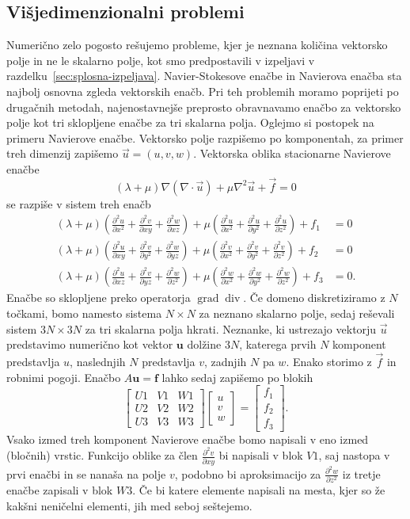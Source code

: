 \documentclass[12pt,a4paper,twoside]{article}
\theoremstyle{definition} %
\theoremstyle{plain} %
\numberwithin{equation}{section}
\renewcommand{\div}{\operatorname{div}}
\newcommand{\grad}{\operatorname{grad}}
\renewcommand{\b}{\boldsymbol}
\newcommand{\dpar}[2]{\ensuremath{\frac{\partial #1}{\partial #2}}}
\newcommand{\vu}{\vec{u}}
\newcommand{\vf}{\vec{f}}
\begin{document}
\subsection{Višjedimenzionalni problemi}
Numerično zelo pogosto rešujemo probleme, kjer je neznana količina vektorsko polje in
ne le skalarno polje, kot smo predpostavili v izpeljavi v
razdelku~\ref{sec:splosna-izpeljava}.  Navier-Stokesove enačbe in Navierova
enačba sta najbolj osnovna zgleda vektorskih enačb. Pri teh problemih moramo poprijeti
po drugačnih metodah, najenostavnejše preprosto obravnavamo enačbo za vektorsko polje
kot tri sklopljene enačbe za tri skalarna polja. Oglejmo si postopek na primeru Navierove
enačbe. Vektorsko polje razpišemo po komponentah, za primer treh dimenzij zapišemo
$\vu = (u, v, w)$. Vektorska oblika stacionarne Navierove enačbe
\[
  (\lambda+\mu)\nabla(\nabla\cdot \vu) + \mu\nabla^2 \vu + \vf = 0
\]
se razpiše v sistem treh enačb
\begin{align*}
(\lambda +\mu ) \left(\dpar{^2u}{x^2}+\dpar{^2v}{xy}+\dpar{^2w}{xz}\right)+\mu  \left(\dpar{^2u}{x^2}+\dpar{^2u}{y^2}+\dpar{^2u}{z^2}\right)+f_1&=0 \\
(\lambda +\mu ) \left(\dpar{^2u}{xy}+\dpar{^2v}{y^2}+\dpar{^2w}{yz}\right)+\mu  \left(\dpar{^2v}{x^2}+\dpar{^2v}{y^2}+\dpar{^2v}{z^2}\right)+f_2&=0 \\
(\lambda +\mu ) \left(\dpar{^2u}{xz}+\dpar{^2v}{yz}+\dpar{^2w}{z^2}\right)+\mu  \left(\dpar{^2w}{x^2}+\dpar{^2w}{y^2}+\dpar{^2w}{z^2}\right)+f_3&=0.
\end{align*}
Enačbe so sklopljene preko operatorja $\grad\div$. Če domeno diskretiziramo z $N$ točkami, bomo
namesto sistema $N\times N$ za neznano skalarno polje, sedaj reševali sistem $3N\times 3N$ za
tri skalarna polja hkrati. Neznanke, ki ustrezajo vektorju $\vu$ predstavimo numerično kot vektor
$\b{u}$ dolžine $3N$, katerega prvih $N$ komponent predstavlja $u$, naslednjih $N$ predstavlja $v$,
zadnjih $N$ pa $w$. Enako storimo z $\vf$ in robnimi pogoji. Enačbo $A\b u = \b f$ lahko sedaj
zapišemo po blokih
\[
  \begin{bmatrix}
    U1 & V1 & W1 \\
    U2 & V2 & W2 \\
    U3 & V3 & W3
  \end{bmatrix}
  \begin{bmatrix}
    u \\ v \\ w
  \end{bmatrix}
  =
  \begin{bmatrix}
    f_1 \\ f_2 \\ f_3
  \end{bmatrix}.
\]
Vsako izmed treh komponent Navierove enačbe bomo napisali v eno izmed (bločnih) vrstic. Funkcijo
oblike za člen $\dpar{^2v}{xy}$ bi napisali v blok $V1$, saj nastopa v prvi enačbi in se nanaša na
polje $v$, podobno bi aproksimacijo za $\dpar{^2w}{z^2}$ iz tretje enačbe zapisali v blok $W3$.
Če bi katere elemente napisali na mesta, kjer so že kakšni neničelni elementi, jih med seboj
seštejemo.
\end{document}

